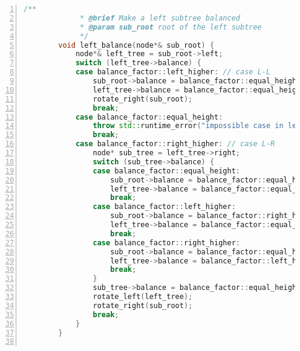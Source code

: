\documentclass{article}
\begin{document}
\begin{lstlisting}[xleftmargin = 2em,xrightmargin = 2em, aboveskip = 0.5em, numbers = left, language = C++]
        /**
    		 * @brief Make a left subtree balanced
    		 * @param sub_root root of the left subtree
    		 */
        void left_balance(node*& sub_root) {
            node*& left_tree = sub_root->left;
            switch (left_tree->balance) {
            case balance_factor::left_higher: // case L-L
                sub_root->balance = balance_factor::equal_height;
                left_tree->balance = balance_factor::equal_height;
                rotate_right(sub_root);
                break;
            case balance_factor::equal_height:
                throw std::runtime_error("impossible case in left_balance");
                break;
            case balance_factor::right_higher: // case L-R
                node* sub_tree = left_tree->right;
                switch (sub_tree->balance) {
                case balance_factor::equal_height:
                    sub_root->balance = balance_factor::equal_height;
                    left_tree->balance = balance_factor::equal_height;
                    break;
                case balance_factor::left_higher:
                    sub_root->balance = balance_factor::right_higher;
                    left_tree->balance = balance_factor::equal_height;
                    break;
                case balance_factor::right_higher:
                    sub_root->balance = balance_factor::equal_height;
                    left_tree->balance = balance_factor::left_higher;
                    break;
                }
                sub_tree->balance = balance_factor::equal_height;
                rotate_left(left_tree);
                rotate_right(sub_root);
                break;
            }
        }


\end{lstlisting}
\end{document}
